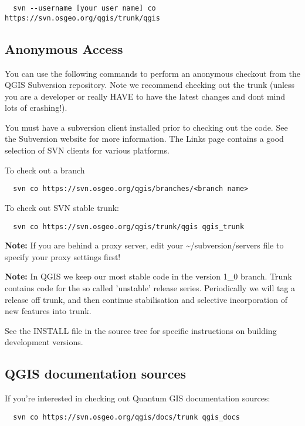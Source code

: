 \begin{verbatim}
  svn --username [your user name] co https://svn.osgeo.org/qgis/trunk/qgis
\end{verbatim}

\subsection{Anonymous Access}
You can use the following commands to perform an anonymous checkout from the
QGIS Subversion repository.  Note we recommend checking out the trunk (unless
you are a developer or really HAVE to have the latest changes and dont mind
lots of crashing!).

You must have a subversion client installed prior to checking out the code. See
the Subversion website for more information. The Links page contains a good
selection of SVN clients for various platforms.

To check out a branch

\begin{verbatim}
  svn co https://svn.osgeo.org/qgis/branches/<branch name>
\end{verbatim}

To check out SVN stable trunk:

\begin{verbatim}
  svn co https://svn.osgeo.org/qgis/trunk/qgis qgis_trunk
\end{verbatim}

\textbf{Note:} If you are behind a proxy server, edit your \~{}/subversion/servers
file to specify your proxy settings first!

\textbf{Note:} In QGIS we keep our most stable code in the version 1\_0 branch.
Trunk contains code for the so called 'unstable' release series. Periodically
we will tag a release off trunk, and then continue stabilisation and selective
incorporation of new features into trunk.

See the INSTALL file in the source tree for specific instructions on building
development versions. 

\subsection{QGIS documentation sources}
If you're interested in checking out Quantum GIS documentation sources:

\begin{verbatim}
  svn co https://svn.osgeo.org/qgis/docs/trunk qgis_docs
\end{verbatim}

